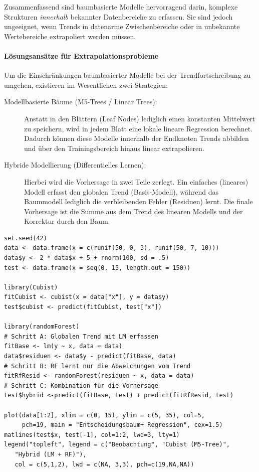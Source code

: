 \documentclass[10pt,twocolumn]{scrartcl}
\begin{document}
Zusammenfassend sind baumbasierte Modelle hervorragend darin, komplexe Strukturen \emph{innerhalb} bekannter Datenbereiche zu erfassen. Sie sind jedoch ungeeignet, wenn Trends in datenarme Zwischenbereiche oder in unbekannte Wertebereiche extrapoliert werden müssen.

\paragraph{Lösungsansätze für Extrapolationsprobleme}

Um die Einschränkungen baumbasierter Modelle bei der Trendfortschreibung zu umgehen, existieren im Wesentlichen zwei Strategien:

\begin{description}
\item[Modellbasierte Bäume (M5-Trees / Linear Trees):] Anstatt in den Blättern (Leaf Nodes) lediglich einen konstanten Mittelwert zu speichern, wird in jedem Blatt eine lokale lineare Regression berechnet. Dadurch können diese Modelle innerhalb der Endknoten Trends abbilden und über den Trainingsbereich hinaus linear extrapolieren.
\item[Hybride Modellierung (Differentielles Lernen):] Hierbei wird die Vorhersage in zwei Teile zerlegt. Ein einfaches (lineares) Modell erfasst den globalen Trend (Basis-Modell), während das Baummodell lediglich die verbleibenden Fehler (Residuen) lernt. Die finale Vorhersage ist die Summe aus dem Trend des linearen Modells und der Korrektur durch den Baum.
\end{description}

\begin{lstlisting}
set.seed(42)
data <- data.frame(x = c(runif(50, 0, 3), runif(50, 7, 10)))
data$y <- 2 * data$x + 5 + rnorm(100, sd = .5)
test <- data.frame(x = seq(0, 15, length.out = 150))

library(Cubist)
fitCubist <- cubist(x = data["x"], y = data$y)
test$cubist <- predict(fitCubist, test["x"])

library(randomForest)
# Schritt A: Globalen Trend mit LM erfassen
fitBase <- lm(y ~ x, data = data)
data$residuen <- data$y - predict(fitBase, data)
# Schritt B: RF lernt nur die Abweichungen vom Trend
fitRfResid <- randomForest(residuen ~ x, data = data)
# Schritt C: Kombination für die Vorhersage
test$hybrid <-predict(fitBase, test) + predict(fitRfResid, test)

plot(data[1:2], xlim = c(0, 15), ylim = c(5, 35), col=5,
     pch=19, main = "Entscheidungsbaum+ Regression", cex=1.5)
matlines(test$x, test[-1], col=1:2, lwd=3, lty=1)
legend("topleft", legend = c("Beobachtung", "Cubist (M5-Tree)",
   "Hybrid (LM + RF)"),
   col = c(5,1,2), lwd = c(NA, 3,3), pch=c(19,NA,NA))
\end{lstlisting}
\end{document}
